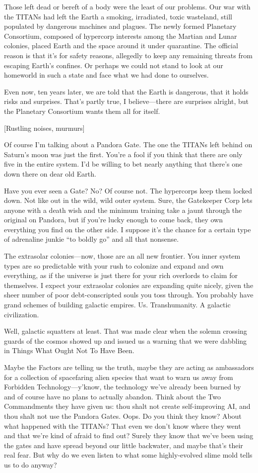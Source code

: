 Those left dead or bereft of a body were the least of our problems. Our war with the TITANs had left the Earth a smoking, irradiated, toxic wasteland, still populated by dangerous machines and plagues. The newly formed Planetary Consortium, composed of hypercorp interests among the Martian and Lunar colonies, placed Earth and the space around it under quarantine. The official reason is that it's for safety reasons, allegedly to keep any remaining threats from escaping Earth's confines. Or perhaps we could not stand to look at our homeworld in such a state and face what we had done to ourselves. 

Even now, ten years later, we are told that the Earth is dangerous, that it holds risks and surprises. That's partly true, I believe—there are surprises alright, but the Planetary Consortium wants them all for itself. 

[Rustling noises, murmurs] 

Of course I'm talking about a Pandora Gate. The one the TITANs left behind on Saturn's moon was just the first. You're a fool if you think that there are only five in the entire system. I'd be willing to bet nearly anything that there's one down there on dear old Earth. 

Have you ever seen a Gate? No? Of course not. The hypercorps keep them locked down. Not like out in the wild, wild outer system. Sure, the Gatekeeper Corp lets anyone with a death wish and the minimum training take a jaunt through the original on Pandora, but if you're lucky enough to come back, they own everything you find on the other side. I suppose it's the chance for a certain type of adrenaline junkie “to boldly go” and all that nonsense. 

The extrasolar colonies—now, those are an all new frontier. You inner system types are so predictable with your rush to colonize and expand and own everything, as if the universe is just there for your rich overlords to claim for themselves. I expect your extrasolar colonies are expanding quite nicely, given the sheer number of poor debt-conscripted souls you toss through. You probably have grand schemes of building galactic empires. Us. Transhumanity. A galactic civilization. 

Well, galactic squatters at least. That was made clear when the solemn crossing guards of the cosmos showed up and issued us a warning that we were dabbling in Things What Ought Not To Have Been. 

Maybe the Factors are telling us the truth, maybe they are acting as ambassadors for a collection of spacefaring alien species that want to warn us away from Forbidden Technology—y'know, the technology we've already been burned by and of course have no plans to actually abandon. Think about the Two Commandments they have given us: thou shalt not create self-improving AI, and thou shalt not use the Pandora Gates. Oops. Do you think they know? About what happened with the TITANs? That even we don't know where they went and that we're kind of afraid to find out? Surely they know that we've been using the gates and have spread beyond our little backwater, and maybe that's their real fear. But why do we even listen to what some highly-evolved slime mold tells us to do anyway? 

